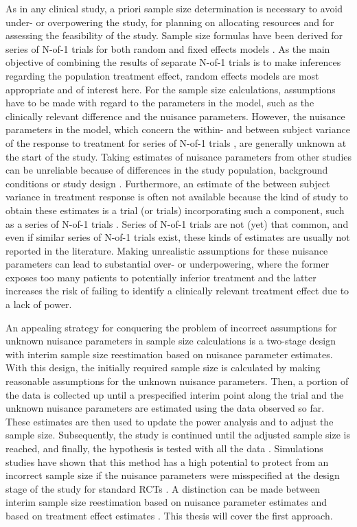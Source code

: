 \documentclass[AMA,STIX1COL,]{WileyNJD-v2}
\begin{document}
As in any clinical study, a priori sample size determination is necessary to avoid under- or overpowering the study, for planning on allocating resources and for assessing the feasibility of the study. Sample size formulas have been derived for series of N-of-1 trials for both random and fixed effects models \citep{senn2019}. As the main objective of combining the results of separate N-of-1 trials is to make inferences regarding the population treatment effect, random effects models are most appropriate and of interest here. For the sample size calculations, assumptions have to be made with regard to the parameters in the model, such as the clinically relevant difference and the nuisance parameters. However, the nuisance parameters in the model, which concern the within- and between subject variance of the response to treatment for series of N-of-1 trials \citep{araujo2016}, are generally unknown at the start of the study. Taking estimates of nuisance parameters from other studies can be unreliable because of differences in the study population, background conditions or study design \citep{zucker2002}. Furthermore, an estimate of the between subject variance in treatment response is often not available because the kind of study to obtain these estimates is a trial (or trials) incorporating such a component, such as a series of N-of-1 trials \citep{senn2016}. Series of N-of-1 trials are not (yet) that common, and even if similar series of N-of-1 trials exist, these kinds of estimates are usually not reported in the literature. Making unrealistic assumptions for these nuisance parameters can lead to substantial over- or underpowering, where the former exposes too many patients to potentially inferior treatment and the latter increases the risk of failing to identify a clinically relevant treatment effect due to a lack of power.

An appealing strategy for conquering the problem of incorrect assumptions for unknown nuisance parameters in sample size calculations is a two-stage design with interim sample size reestimation based on nuisance parameter estimates. With this design, the initially required sample size is calculated by making reasonable assumptions for the unknown nuisance parameters. Then, a portion of the data is collected up until a prespecified interim point along the trial and the unknown nuisance parameters are estimated using the data observed so far. These estimates are then used to update the power analysis and to adjust the sample size. Subsequently, the study is continued until the adjusted sample size is reached, and finally, the hypothesis is tested with all the data \citep{proschan2005}. Simulations studies have shown that this method has a high potential to protect from an incorrect sample size if the nuisance parameters were misspecified at the design stage of the study for standard RCTs \citep{wittes1990}. A distinction can be made between interim sample size reestimation based on nuisance parameter estimates and based on treatment effect estimates \citep{proschan2009}. This thesis will cover the first approach.
\end{document}
